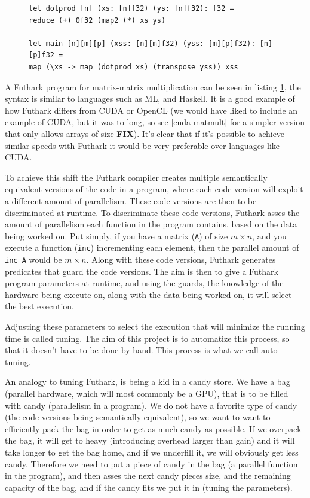 \begin{figure}
\centering
\lstset{language=haskell}
\begin{lstlisting}
let dotprod [n] (xs: [n]f32) (ys: [n]f32): f32 =
reduce (+) 0f32 (map2 (*) xs ys)

let main [n][m][p] (xss: [n][m]f32) (yss: [m][p]f32): [n][p]f32 =
map (\xs -> map (dotprod xs) (transpose yss)) xss
\end{lstlisting}%
\label{IntromatmultFuthark}
\end{figure}
A Futhark program for matrix-matrix multiplication can be seen in listing
\ref{IntromatmultFuthark}, the syntax is similar to languages such as ML, and
Haskell. It is a good example of how Futhark differs from CUDA or OpenCL (we
would have liked to include an example of CUDA, but it was to long, so see
\ref{cuda-matmult} for a simpler version that only allows arrays of size
\textbf{FIX}). It's clear that if it's possible to achieve similar speeds 
with Futhark it would be very preferable over languages like CUDA.


To achieve this shift the Futhark compiler creates multiple semantically
equivalent versions of the code in a program, where each code version will
exploit a different amount of parallelism. These code versions are then to be
discriminated at runtime. To discriminate these code versions, Futhark asses
the amount of parallelism each function in the program contains, based on the
data being worked on. Put simply, if you have a matrix (\texttt{A}) of size $m
\times n$, and you execute a function (\texttt{inc}) incrementing each element,
then the parallel amount of \texttt{inc A} would be $m \times n$. Along with
these code versions, Futhark generates predicates that guard the code versions.
The aim is then to give a Futhark program parameters at runtime, and using the
guards, the knowledge of the hardware being execute on, along with the data
being worked on, it will select the best execution.

Adjusting these parameters to select the execution that will minimize the
running time is called tuning. The aim of this project is to automatize this
process, so that it doesn't have to be done by hand. This process is what we
call auto-tuning.

An analogy to tuning Futhark, is being a kid in a candy store. We have a bag
(parallel hardware, which will most commonly be a GPU), that is to be filled
with candy (parallelism in a program). We do not have a favorite type of candy
(the code versions being semantically equivalent), so we want to want to
efficiently pack the bag in order to get as much candy as possible. If we
overpack the bag, it will get to heavy (introducing overhead larger than gain)
and it will take longer to get the bag home, and if we underfill it, we will
obviously get less candy. Therefore we need to put a piece of candy in the bag
(a parallel function in the program), and then asses the next candy pieces
size, and the remaining capacity of the bag, and if the candy fits we put it in
(tuning the parameters). 
